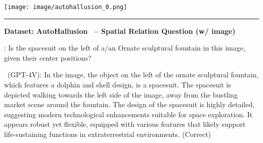 \begin{boxK}
\begin{minipage}{0.75\linewidth}
\end{minipage}\hfill
\begin{minipage}{0.22\linewidth}
    \centering
    \texttt{[image: image/autohallusion\_0.png]} 
\end{minipage}

\vspace{2pt}




\vspace{2pt}
\hrule
\vspace{2pt}

\textbf{Dataset: AutoHallusion~\cite{AutoHallusion} -- Spatial Relation Question (w/ image)}

\begin{minipage}{0.75\linewidth}

\user: Is the spacesuit on the left of a/an Ornate sculptural fountain in this image, given their center positions?

\robot\ (GPT-4V): In the image, the object on the left of the ornate sculptural fountain, which features a dolphin and shell design, is a spacesuit. The spacesuit is depicted walking towards the left side of the image, away from the bustling market scene around the fountain. The design of the spacesuit is highly detailed, suggesting modern technological enhancements suitable for space exploration. It appears robust yet flexible, equipped with various features that likely support life-sustaining functions in extraterrestrial environments. (\textcolor{green!50!black}{Correct})



\end{minipage}
\end{boxK}
